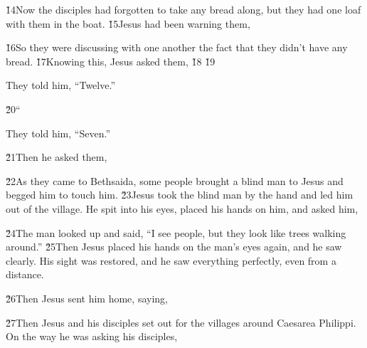 \v{14}Now the disciples had forgotten to take any bread along, but they had one loaf with them in the boat. \v{15}Jesus had been warning them, 

\v{16}So they were discussing with one another the fact that they didn't have any bread. \v{17}Knowing this, Jesus asked them,  \v{18} \v{19}

They told him, ``Twelve.''

\v{20}``

They told him, ``Seven.''

\v{21}Then he asked them, 

\v{22}As they came to Bethsaida, some people brought a blind man to Jesus and begged him to touch him. \v{23}Jesus took the blind man by the hand and led him out of the village. He spit into his eyes, placed his hands on him, and asked him, 

\v{24}The man looked up and said, ``I see people, but they look like trees walking around.'' \v{25}Then Jesus placed his hands on the man's eyes again, and he saw clearly. His sight was restored, and he saw everything perfectly, even from a distance.

\v{26}Then Jesus sent him home, saying, 

\v{27}Then Jesus and his disciples set out for the villages around Caesarea Philippi. On the way he was asking his disciples, 

